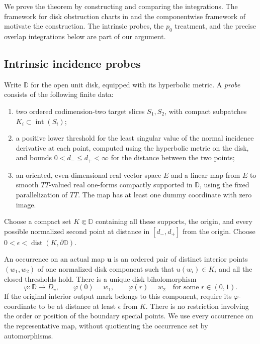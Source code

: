 \documentclass[11pt]{article}
\theoremstyle{definition}
\theoremstyle{remark}
\numberwithin{equation}{section}
\begin{document}
We prove the theorem by constructing and comparing the integrations.
The framework for disk obstruction charts in
\cite[Theorem~7.1 and Condition~7.11]{fooo-i} and the componentwise
framework of \cite[Theorems~2.5, 5.3--5.4 and Remark~6.1]{fooo-ii}
motivate the construction.  The intrinsic probes, the $p_0$ treatment,
and the precise overlap integrations below are part of our argument.

\subsection{Intrinsic incidence probes}

Write $\mathbb D$ for the open unit disk, equipped with its hyperbolic
metric.  A \emph{probe} consists of the following finite data:
\begin{enumerate}[label=\textup{(\alph*)}]
\item two ordered codimension-two target slices $S_1,S_2$, with compact
subpatches $K_i\subset\operatorname{int}(S_i)$;
\item a positive lower threshold for the least singular value of the
normal incidence derivative at each point, computed using the hyperbolic
metric on the disk, and bounds
$0<d_-\le d_+<\infty$ for the distance between the two points;
\item an oriented, even-dimensional real vector space $E$ and a linear
map from $E$ to smooth $TT$-valued real one-forms compactly supported in
$\mathbb D$, using the fixed parallelization of $TT$.  The map has at
least one dummy coordinate with zero image.
\end{enumerate}
Choose a compact set $K\Subset\mathbb D$ containing all these supports,
the origin, and every possible normalized second point at distance in
$[d_-,d_+]$ from the origin.  Choose
$0<\epsilon<\operatorname{dist}(K,\partial\mathbb D)$.

An occurrence on an actual map $\mathbf u$ is an ordered pair of distinct
interior points $(w_1,w_2)$ of one normalized disk component such that
$u(w_i)\in K_i$ and all the closed thresholds hold.  There is a unique
disk biholomorphism
\[
 \varphi:\mathbb D\longrightarrow D_v,
 \qquad \varphi(0)=w_1,\qquad
 \varphi(r)=w_2\quad\text{for some }r\in(0,1).
\]
If the original interior output mark belongs to this component, require
its $\varphi$-coordinate to be at distance at least $\epsilon$ from $K$.
There is no restriction involving the order or position of the boundary
special points.  We use every occurrence on the representative map,
without quotienting the occurrence set by automorphisms.
\end{document}
